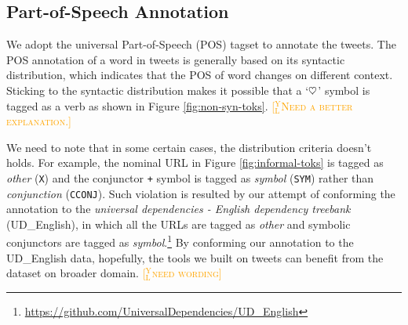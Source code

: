 \documentclass[11pt,letterpaper]{article}
\newcommand{\heart}{\ensuremath\heartsuit}
\newcommand{\yjcomment}[1]{\textcolor{orange}{[$_\mathrm{L}^\mathrm{Y}$\textsc{#1}]}}
\begin{document}
%


\subsection{Part-of-Speech Annotation}\label{sec:pos-anno}
We adopt the universal Part-of-Speech (POS) tagset \cite{PETROV12.274} to annotate the tweets.
The POS annotation of a word in tweets is generally based on its syntactic distribution, which indicates that the POS of word changes on different context.
Sticking to the syntactic distribution makes it possible that a `$\heart$' symbol is tagged as a verb as shown in Figure \ref{fig:non-syn-toks}. \yjcomment{Need a better explanation.}

We need to note that in some certain cases, the distribution criteria doesn't holds.
For example, the nominal URL in Figure \ref{fig:informal-toks} is tagged as {\it other} ({\tt X}) and the conjunctor {\tt +} symbol is tagged as {\it symbol} ({\tt SYM}) rather than {\it conjunction} ({\tt CCONJ}).
Such violation is resulted by our attempt of conforming the annotation to the {\it universal dependencies - English dependency treebank} (UD\_English), in which all the URLs are tagged as {\it other} and symbolic conjunctors are tagged as {\it symbol}.\footnote{\url{https://github.com/UniversalDependencies/UD\_English}}
By conforming our annotation to the UD\_English data, hopefully, the tools we built on tweets can benefit from the dataset on broader domain. \yjcomment{need wording}
\end{document}
